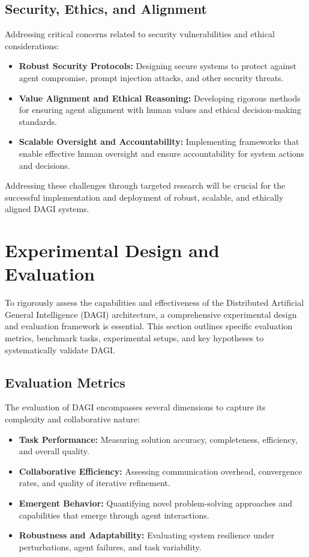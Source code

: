\documentclass[12pt]{amsart}
\begin{document}
\subsection{Security, Ethics, and Alignment}

Addressing critical concerns related to security vulnerabilities and ethical considerations:

\begin{itemize}
    \item \textbf{Robust Security Protocols:} Designing secure systems to protect against agent compromise, prompt injection attacks, and other security threats.
    \item \textbf{Value Alignment and Ethical Reasoning:} Developing rigorous methods for ensuring agent alignment with human values and ethical decision-making standards.
    \item \textbf{Scalable Oversight and Accountability:} Implementing frameworks that enable effective human oversight and ensure accountability for system actions and decisions.
\end{itemize}

Addressing these challenges through targeted research will be crucial for the successful implementation and deployment of robust, scalable, and ethically aligned DAGI systems.



\section{Experimental Design and Evaluation}

To rigorously assess the capabilities and effectiveness of the Distributed Artificial General Intelligence (DAGI) architecture, a comprehensive experimental design and evaluation framework is essential. This section outlines specific evaluation metrics, benchmark tasks, experimental setups, and key hypotheses to systematically validate DAGI.

\subsection{Evaluation Metrics}

The evaluation of DAGI encompasses several dimensions to capture its complexity and collaborative nature:

\begin{itemize}
    \item \textbf{Task Performance:} Measuring solution accuracy, completeness, efficiency, and overall quality.
    \item \textbf{Collaborative Efficiency:} Assessing communication overhead, convergence rates, and quality of iterative refinement.
    \item \textbf{Emergent Behavior:} Quantifying novel problem-solving approaches and capabilities that emerge through agent interactions.
    \item \textbf{Robustness and Adaptability:} Evaluating system resilience under perturbations, agent failures, and task variability.
\end{itemize}
\end{document}
